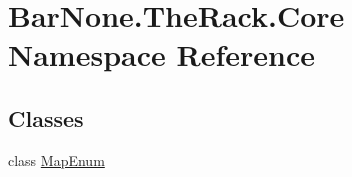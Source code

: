 \hypertarget{namespace_bar_none_1_1_the_rack_1_1_core}{}\section{Bar\+None.\+The\+Rack.\+Core Namespace Reference}
\label{namespace_bar_none_1_1_the_rack_1_1_core}
\subsection*{Classes}
\begin{DoxyCompactItemize}
\item 
class \mbox{\hyperlink{class_bar_none_1_1_the_rack_1_1_core_1_1_map_enum}{Map\+Enum}}
\end{DoxyCompactItemize}
